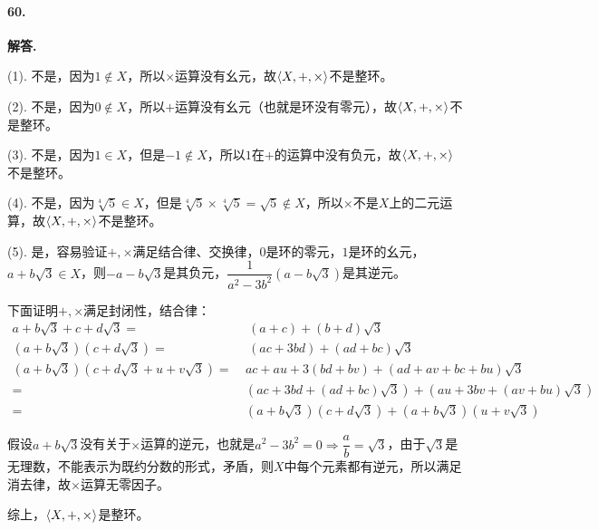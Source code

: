 \documentclass[12pt, a4paper, oneside]{ctexart}
\newenvironment{solution}{\par\noindent\textbf{解答. }}{\bigskip\par}
\begin{document}
\paragraph{60.}\begin{solution}

    (1). 不是，因为$1\notin X$，所以$\times$运算没有幺元，故$\braket{X,+,\times}$不是整环。

    (2). 不是，因为$0\notin X$，所以$+$运算没有幺元（也就是环没有零元），故$\braket{X,+,\times}$不是整环。

    (3). 不是，因为$1\in X$，但是$-1\notin X$，所以$1$在$+$的运算中没有负元，故$\braket{X,+,\times}$不是整环。

    (4). 不是，因为$\sqrt[4]{5}\in X$，但是$\sqrt[4]{5}\times\sqrt[4]{5}=\sqrt{5}\notin X$，所以$\times$不是$X$上的二元运算，故$\braket{X,+,\times}$不是整环。

    (5). 是，容易验证$+,\times$满足结合律、交换律，$0$是环的零元，$1$是环的幺元，$a+b\sqrt{3}\in X$，则$-a-b\sqrt{3}$是其负元，$\dfrac{1}{a^2-3b^2}(a-b\sqrt{3})$是其逆元。
    
    下面证明$+,\times$满足封闭性，结合律：
    \begin{equation*}
        \begin{aligned}
            a+b\sqrt{3}+c+d\sqrt{3} =&\ (a+c)+(b+d)\sqrt{3}\\
            (a+b\sqrt{3})(c+d\sqrt{3}) =&\  (ac+3bd)+(ad+bc)\sqrt{3}\\
            (a+b\sqrt{3})(c+d\sqrt{3}+u+v\sqrt{3})=\ &ac+au+3(bd+bv)+(ad+av+bc+bu)\sqrt{3}\\
            =\ &(ac+3bd+(ad+bc)\sqrt{3})+(au+3bv+(av+bu)\sqrt{3})\\
            =\ &(a+b\sqrt{3})(c+d\sqrt{3})+(a+b\sqrt{3})(u+v\sqrt{3})
        \end{aligned}
    \end{equation*}

    假设$a+b\sqrt{3}$没有关于$\times$运算的逆元，也就是$a^2-3b^2=0\Rightarrow\dfrac{a}{b}=\sqrt{3}$，由于$\sqrt{3}$是无理数，不能表示为既约分数的形式，矛盾，则$X$中每个元素都有逆元，所以满足消去律，故$\times$运算无零因子。

    综上，$\braket{X,+,\times}$是整环。
\end{solution}
\end{document}
